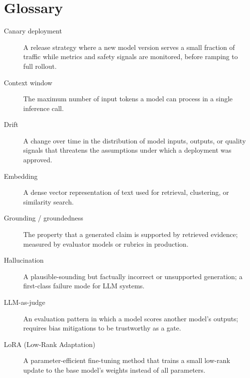 \chapter*{Glossary}


\begin{description}
  \item[Canary deployment]
        A release strategy where a new model version
        serves a small fraction of traffic while metrics and safety
        signals are monitored, before ramping to full rollout.

  \item[Context window]
        The maximum number of input tokens a model can
        process in a single inference call.

  \item[Drift]
        A change over time in the distribution of model
        inputs, outputs, or quality signals that threatens the
        assumptions under which a deployment was approved.

  \item[Embedding]
        A dense vector representation of text used for
        retrieval, clustering, or similarity search.

  \item[Grounding / groundedness]
        The property that a generated claim is supported
        by retrieved evidence; measured by evaluator models or rubrics
        in production.

  \item[Hallucination]
        A plausible-sounding but factually incorrect or
        unsupported generation; a first-class failure mode for LLM
        systems.

  \item[LLM-as-judge]
        An evaluation pattern in which a model scores
        another model's outputs; requires bias mitigations to be
        trustworthy as a gate.

  \item[LoRA (Low-Rank Adaptation)]
        A parameter-efficient fine-tuning method that
        trains a small low-rank update to the base model's weights
        instead of all parameters.


\end{description}
